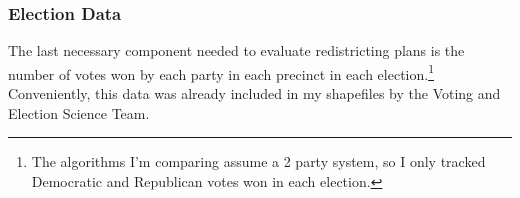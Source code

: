 \subsubsection{Election Data}

The last necessary component needed to evaluate redistricting plans is the number of votes won by each party in each precinct in each election.\footnote{The algorithms I'm comparing assume a 2 party system, so I only tracked Democratic and Republican votes won in each election.} Conveniently, this data was already included in my shapefiles by the Voting and Election Science Team. 